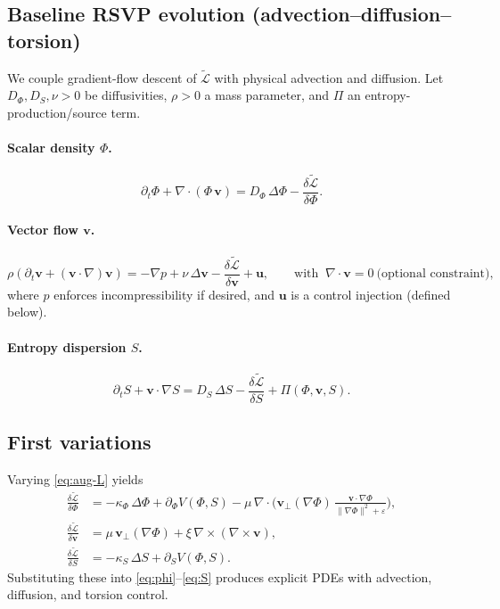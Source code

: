 \documentclass[a4paper,11pt]{article}
\begin{document}
\subsection{Baseline RSVP evolution (advection–diffusion–torsion)}
We couple gradient-flow descent of \(\widetilde{\mathcal{L}}\) with physical
advection and diffusion. Let \(D_\Phi,D_S,\nu>0\) be diffusivities, \(\rho>0\) a
mass parameter, and \(\Pi\) an entropy-production/source term.

\paragraph{Scalar density \(\Phi\).}
\begin{equation}
\label{eq:phi}
\partial_t \Phi
+\nabla\!\cdot(\Phi\,\mathbf{v})
=
D_\Phi\,\Delta \Phi
-\frac{\delta \widetilde{\mathcal{L}}}{\delta \Phi}.
\end{equation}

\paragraph{Vector flow \(\mathbf{v}\).}
\begin{equation}
\label{eq:v}
\rho\left(\partial_t \mathbf{v} + (\mathbf{v}\!\cdot\!\nabla)\mathbf{v}\right)
=
-\nabla p
+\nu\,\Delta \mathbf{v}
-\frac{\delta \widetilde{\mathcal{L}}}{\delta \mathbf{v}}
+\mathbf{u},
\qquad
\text{with }\ \nabla\!\cdot\mathbf{v}=0\ \text{(optional constraint)},
\end{equation}
where \(p\) enforces incompressibility if desired, and \(\mathbf{u}\) is a control
injection (defined below).

\paragraph{Entropy dispersion \(S\).}
\begin{equation}
\label{eq:S}
\partial_t S
+\mathbf{v}\!\cdot\!\nabla S
=
D_S\,\Delta S
-\frac{\delta \widetilde{\mathcal{L}}}{\delta S}
+\Pi(\Phi,\mathbf{v},S).
\end{equation}

\subsection{First variations}
Varying \eqref{eq:aug-L} yields
\begin{align}
\frac{\delta \widetilde{\mathcal{L}}}{\delta \Phi}
&=
-\kappa_\Phi\,\Delta \Phi
+\partial_\Phi V(\Phi,S)
-\mu\,\nabla\!\cdot\!\Big(
\mathbf{v}_\perp(\nabla\Phi)\,\frac{\mathbf{v}\!\cdot\!\nabla\Phi}{\|\nabla\Phi\|^2+\varepsilon}
\Big),
\\[4pt]
\frac{\delta \widetilde{\mathcal{L}}}{\delta \mathbf{v}}
&=
\mu\,\mathbf{v}_\perp(\nabla\Phi)
+\xi\,\nabla\times(\nabla\times \mathbf{v}),
\\[4pt]
\frac{\delta \widetilde{\mathcal{L}}}{\delta S}
&=
-\kappa_S\,\Delta S
+\partial_S V(\Phi,S).
\end{align}
Substituting these into \eqref{eq:phi}–\eqref{eq:S} produces explicit PDEs with
advection, diffusion, and torsion control.
\end{document}

